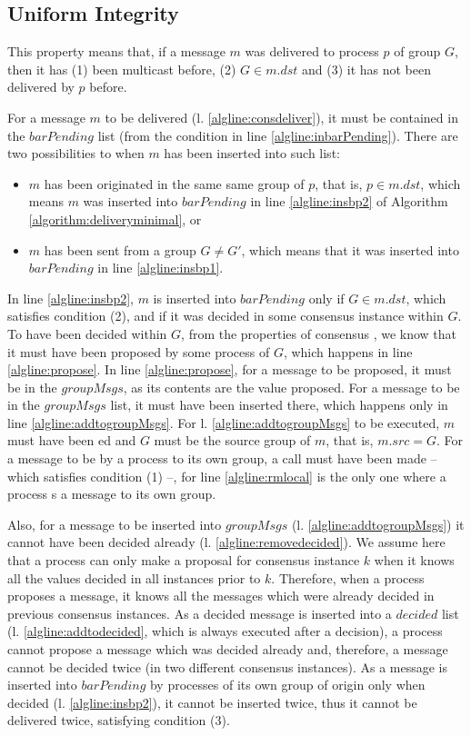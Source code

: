 \documentclass[times, 10pt]{article}
\begin{document}
\subsection{Uniform Integrity}

This property means that, if a message $m$ was delivered to process $p$ of group $G$, then it has (1) been multicast before, (2) $G \in m.dst$ and (3) it has not been delivered by $p$ before.

For a message $m$ to be delivered (l. \ref{algline:consdeliver}), it must be contained in the $barPending$ list (from the condition in line \ref{algline:inbarPending}).  There are two possibilities to when $m$ has been inserted into such list:
\begin{itemize}
  \item $m$ has been originated in the same same group of $p$, that is, $p \in m.dst$, which means $m$ was inserted into $barPending$ in line \ref{algline:insbp2} of Algorithm \ref{algorithm:deliveryminimal}, or
  \item $m$ has been sent from a group $G \neq G'$, which means that it was inserted into $barPending$ in line \ref{algline:insbp1}. 
\end{itemize}

In line \ref{algline:insbp2}, $m$ is inserted into $barPending$ only if $G \in m.dst$, which satisfies condition (2), and if it was decided in some consensus instance within $G$. To have been decided within $G$, from the properties of consensus \cite{lamport1998ptp}, we know that it must have been proposed by some process of $G$, which happens in line \ref{algline:propose}. In line \ref{algline:propose}, for a message to be proposed, it must be in the $groupMsgs$, as its contents are the value proposed. For a message to be in the $groupMsgs$ list, it must have been inserted there, which happens only in line \ref{algline:addtogroupMsgs}. For l. \ref{algline:addtogroupMsgs} to be executed, $m$ must have been \rmdel{}ed and $G$ must be the source group of $m$, that is, $m.src = G$. For a message to be \rmcast{} by a process to its own group, a  call must have been made -- which satisfies condition (1) --, for line \ref{algline:rmlocal} is the only one where a process \rmcast{}s a message to its own group. 

Also, for a message to be inserted into $groupMsgs$ (l. \ref{algline:addtogroupMsgs}) it cannot have been decided already (l. \ref{algline:removedecided}). We assume here that a process can only make a proposal for consensus instance $k$ when it knows all the values decided in all instances prior to $k$. Therefore, when a process proposes a message, it knows all the messages which were already decided in previous consensus instances. As a decided message is inserted into a $decided$ list (l. \ref{algline:addtodecided}, which is always executed after a decision), a process cannot propose a message which was decided already and, therefore, a message cannot be decided twice (in two different consensus instances). As a message is inserted into $barPending$ by processes of its own group of origin only when decided (l. \ref{algline:insbp2}), it cannot be inserted twice, thus it cannot be delivered twice, satisfying condition (3).
\end{document}

